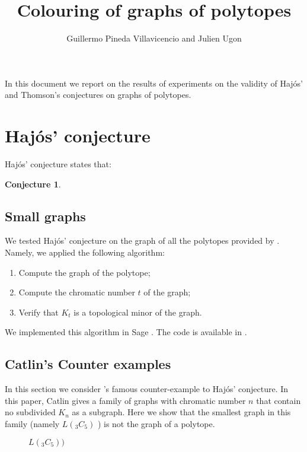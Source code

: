 \documentclass[a4paper,12pt]{article}
\title{Colouring of graphs of polytopes}
\author{Guillermo Pineda Villavicencio and Julien Ugon}
\newtheorem{conjecture}{Conjecture}
\begin{document}
  \maketitle

  In this document we report on the results of experiments on the validity of Haj\'os' and Thomson's conjectures on graphs of polytopes.

  \section{Haj\'os' conjecture}
  Haj\'os' conjecture states that:

  \begin{conjecture}
  \end{conjecture}


  \subsection{Small  graphs}

  We tested Haj\'os' conjecture on the graph of all the polytopes provided by \textcite{matroids}. Namely, we  applied the following  algorithm:

  \begin{enumerate}
    \item Compute the  graph of the polytope;
    \item Compute the chromatic number \(t\) of the graph;
    \item Verify  that \(K_t\) is a topological minor of the graph.
  \end{enumerate}

  We implemented this algorithm in Sage \parencite{SteinJoyner2005}. The code is available in \parencite{repo}.

  \subsection{Catlin's Counter examples}

  In this section we consider  \textcite{catlin1979hajos}'s famous counter-example to Haj\'os' conjecture. In this paper, Catlin gives a family of graphs with chromatic number  \(n\) that contain no  subdivided \(K_n\) as a  subgraph. Here we show that the smallest graph in this family (namely \(L(_3C_5)\) ) is not the  graph of a polytope.

  \begin{figure}
  
  \caption{\(L(_3C_5))\)}
  \label{fig:L3C5}
  \end{figure}
\end{document}
